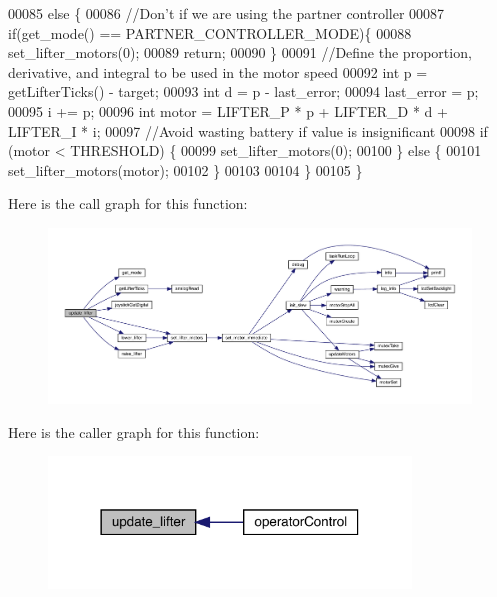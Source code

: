 \begin{DoxyCode}
00085   \textcolor{keywordflow}{else} \{
00086     \textcolor{comment}{//Don't if we are using the partner controller}
00087     \textcolor{keywordflow}{if}(get_mode() == PARTNER_CONTROLLER_MODE)\{
00088       set_lifter_motors(0);
00089       \textcolor{keywordflow}{return};
00090     \}
00091     \textcolor{comment}{//Define the proportion, derivative, and integral to be used in the motor speed}
00092     \textcolor{keywordtype}{int} p = getLifterTicks() - target;
00093     \textcolor{keywordtype}{int} d = p - last\_error;
00094     last\_error = p;
00095     i += p;
00096     \textcolor{keywordtype}{int} motor = LIFTER_P * p + LIFTER_D * d + LIFTER_I * i;
00097     \textcolor{comment}{//Avoid wasting battery if value is insignificant}
00098     \textcolor{keywordflow}{if} (motor < THRESHOLD) \{
00099         set_lifter_motors(0);
00100     \} \textcolor{keywordflow}{else} \{
00101         set_lifter_motors(motor);
00102     \}
00103 
00104   \}
00105 \}
\end{DoxyCode}
Here is the call graph for this function\+:\nopagebreak
\begin{figure}[H]
\begin{center}
\leavevmode
\includegraphics[width=350pt]{lifter_8h_a59bb7413777ca16aba124aaedf95c79b_cgraph}
\end{center}
\end{figure}
Here is the caller graph for this function\+:\nopagebreak
\begin{figure}[H]
\begin{center}
\leavevmode
\includegraphics[width=273pt]{lifter_8h_a59bb7413777ca16aba124aaedf95c79b_icgraph}
\end{center}
\end{figure}
